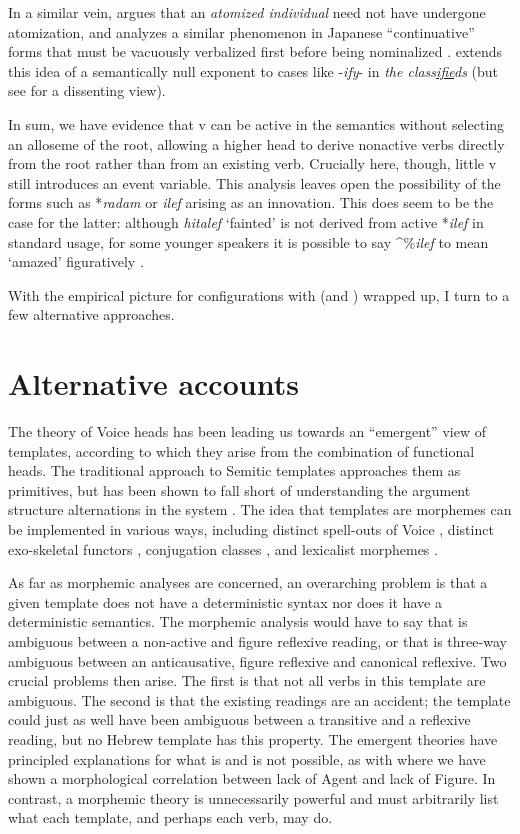 {In a similar vein, \cite{marantz13} argues that an \emph{atomized individual} need not have undergone atomization, and analyzes a similar phenomenon in Japanese ``continuative'' forms that must be vacuously verbalized first{ before being nominalized} \citep{volpe05}. \cite{anagnostopoulou14thli} extends this idea of a semantically null exponent to cases like -\emph{ify}- in \emph{the class\underline{ifie}ds} (but see \citealt{borer14lingua} for a dissenting view).

In sum, we have evidence that v can be active in the semantics without selecting an alloseme of the root, allowing a higher {\vz} head to derive nonactive verbs directly from the root rather than from an existing verb. Crucially here, though, little v still introduces an event variable. This analysis leaves open the possibility of the forms such as *\emph{radam} or \emph{ilef} arising as an innovation. This does seem to be the case for the latter: although \emph{hitalef} `fainted' is not derived from active *\emph{ilef} in standard usage, for some younger speakers it is possible to say ^{\%}\emph{ilef} to mean `amazed' figuratively \citep{laks14}.

With the empirical picture for configurations with {\vz} (and {\pz}) wrapped up, I turn to a few alternative approaches.


\section{Alternative accounts} \label{vz:others}
The theory of Voice heads has been leading us towards an ``emergent'' view of templates, according to which they arise from the combination of functional heads. The traditional approach to Semitic templates approaches them as primitives, but has been shown to fall short of understanding the argument structure alternations in the system \citep{doron03,kastner16phd,kastner17gjgl,kastner18nllt}. The idea that templates are morphemes can be implemented in various ways, including distinct spell-outs of Voice \citep{arad05}, distinct exo-skeletal functors \citep{borer13oup}, conjugation classes \citep{aronoff07}, and lexicalist morphemes \citep{reinhartsiloni05,laks11,laks14}.

As far as morphemic analyses are concerned, an overarching problem is that a given template does not have a deterministic syntax nor does it have a deterministic semantics. The morphemic analysis would have to say that {\tnif} is ambiguous between a non-active and figure reflexive reading, or that {\thit} is three-way ambiguous between an anticausative, figure reflexive and canonical reflexive. Two crucial problems then arise. The first is that not all verbs in this template are ambiguous. The second is that the existing readings are an accident; the template could just as well have been ambiguous between a transitive and a reflexive reading, but no Hebrew template has this property. The emergent theories have principled explanations for what is and is not possible, as with {\tnif} where we have shown a morphological correlation between lack of Agent and lack of Figure. In contrast, a morphemic theory is unnecessarily powerful and must arbitrarily list what each template, and perhaps each verb, may do.

}
